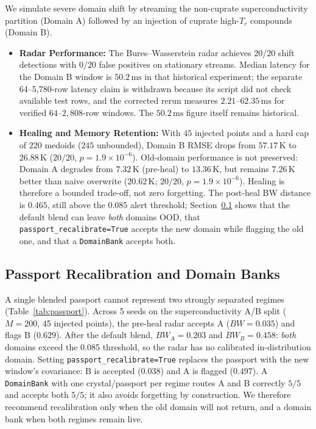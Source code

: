 \documentclass[11pt,a4paper]{article}
\begin{document}
We simulate severe domain shift by streaming the non-cuprate superconductivity partition (Domain A) followed by an injection of cuprate high-$T_c$ compounds (Domain B).
\begin{itemize}
    \item \textbf{Radar Performance:} The Bures--Wasserstein radar achieves $20/20$ shift detections with $0/20$ false positives on stationary streams. Median latency for the Domain B window is $50.2\,\mathrm{ms}$ in that historical experiment; the separate 64--5,780-row latency claim is withdrawn because its script did not check available test rows, and the corrected rerun measures $2.21$--$62.35\,\mathrm{ms}$ for verified $64$--$2{,}808$-row windows. The $50.2\,\mathrm{ms}$ figure itself remains historical.
    \item \textbf{Healing and Memory Retention:} With $45$ injected points and a hard cap of $220$ medoids ($245$ unbounded), Domain B RMSE drops from $57.17\,\mathrm{K}$ to $26.88\,\mathrm{K}$ ($20/20$, $p = 1.9 \times 10^{-6}$). Old-domain performance is not preserved: Domain A degrades from $7.32\,\mathrm{K}$ (pre-heal) to $13.36\,\mathrm{K}$, but remains $7.26\,\mathrm{K}$ better than naive overwrite ($20.62\,\mathrm{K}$; $20/20$, $p = 1.9 \times 10^{-6}$). Healing is therefore a bounded trade-off, not zero forgetting. The post-heal BW distance is $0.465$, still above the $0.085$ alert threshold; Section~\ref{sec:passport} shows that the default blend can leave \emph{both} domains OOD, that \texttt{passport\_recalibrate=True} accepts the new domain while flagging the old one, and that a \texttt{DomainBank} accepts both.
\end{itemize}

\subsection{Passport Recalibration and Domain Banks}
\label{sec:passport}

A single blended passport cannot represent two strongly separated regimes (Table~\ref{tab:passport}). Across 5 seeds on the superconductivity A/B split ($M=200$, 45 injected points), the pre-heal radar accepts A ($BW=0.035$) and flags B ($0.629$). After the default blend, $BW_A=0.203$ and $BW_B=0.458$: \emph{both} domains exceed the 0.085 threshold, so the radar has no calibrated in-distribution domain. Setting \texttt{passport\_recalibrate=True} replaces the passport with the new window's covariance: B is accepted ($0.038$) and A is flagged ($0.497$). A \texttt{DomainBank} with one crystal/passport per regime routes A and B correctly $5/5$ and accepts both $5/5$; it also avoids forgetting by construction. We therefore recommend recalibration only when the old domain will not return, and a domain bank when both regimes remain live.
\end{document}
